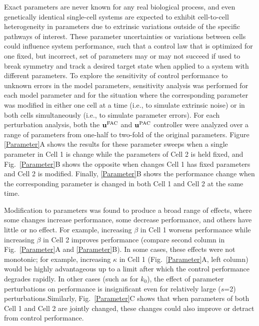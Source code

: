 \documentclass[12pt]{article}
\begin{document}
Exact parameters are never known for any real biological process, and even genetically identical single-cell systems are expected to exhibit cell-to-cell heterogeneity in parameters due to extrinsic variations outside of the specific pathways of interest. These parameter uncertainties or variations between cells could influence system performance, such that a control law that is optimized for one fixed, but incorrect, set of parameters may or may not succeed if used to break symmetry and track a desired target state when applied to a system with different parameters. To explore the sensitivity of control performance to unknown errors in the model parameters, sensitivity analysis was performed for each model parameter and for the situation where the corresponding parameter was modified in either one cell at a time (i.e., to simulate extrinsic noise) or in both cells simultaneously (i.e., to simulate parameter errors).  For each perturbation analysis, both the $\mathbf{u}^{\rm FAC}$ and $\mathbf{u}^{\rm PAC}$ controller were analyzed over a range of parameters from one-half to two-fold of the original parameters.
 Figure \ref{Parameter}A shows the results for these parameter sweeps when a single parameter in Cell 1 is change while the parameters of Cell 2 is held fixed, and Fig.\ \ref{Parameter}B shows the opposite when changes Cell 1 has fixed parameters and Cell 2 is modified.  Finally, \ref{Parameter}B  shows the performance change when the corresponding parameter is changed in both Cell 1 and Cell 2 at the same time.
 
Modification to parameters was found to produce a broad range of effects, where some changes increase performance, some decrease performance, and others have little or no effect. For example, increasing $\beta$ in Cell 1 worsens performance while increasing $\beta$ in Cell 2 improves performance (compare second column in Fig.\ \ref{Parameter}A and \ref{Parameter}B). In some cases, these effects were not monotonic; for example, increasing $\kappa$ in Cell 1 (Fig.\ \ref{Parameter}A, left column) would be highly advantageous up to a limit after which the control performance degrades rapidly. In other cases (such as for $k_0$), the effect of parameter perturbations on performance is insignificant even for relatively large ($s$=2) perturbations.Similarly, Fig.\ \ref{Parameter}C shows that when parameters of both Cell 1 and Cell 2 are jointly changed, these changes could also improve or detract from control performance.
\end{document}
